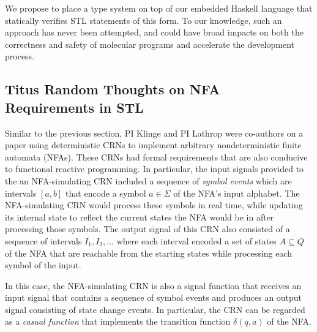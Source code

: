 We propose to place a type system on top of our embedded Haskell language that statically verifies STL statements of this form.
To our knowledge, such an approach has never been attempted, and could have broad impacts on both the correctness and safety of molecular programs and accelerate the development process.

\subsection*{Titus Random Thoughts on NFA Requirements in STL}
Similar to the previous section, PI Klinge and PI Lathrop were co-authors on a paper using deterministic CRNs to implement arbitrary nondeterministic finite automata (NFAs).
These CRNs had formal requirements that are also conducive to functional reactive programming.
In particular, the input signals provided to the an NFA-simulating CRN included a sequence of \emph{symbol events} which are intervals \( [a,b] \) that encode a symbol \( a\in\Sigma \) of the NFA's input alphabet.
The NFA-simulating CRN would process these symbols in real time, while updating its internal state to reflect the current states the NFA would be in after processing those symbols.
The output signal of this CRN also consisted of a sequence of intervals \( I_1, I_2, \ldots \) where each interval encoded a set of states \( A\subseteq Q \) of the NFA that are reachable from the starting states while processing each symbol of the input.

In this case, the NFA-simulating CRN is also a signal function that receives an input signal that contains a sequence of symbol events and produces an output signal consisting of state change events.
In particular, the CRN can be regarded as a \emph{casual function} that implements the transition function \( \delta(q,a) \) of the NFA.
